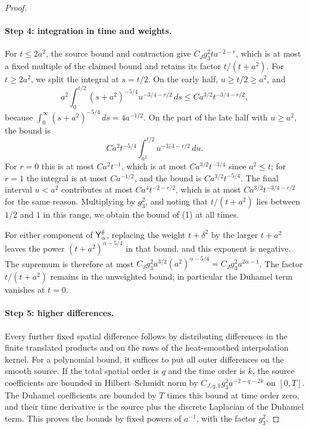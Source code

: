 \begin{proof}
\paragraph{Step 4: integration in time and weights.}
For $t\le2a^2$, the source bound and contraction give $C_Jg_3^2ta^{-2-r}$, which is at most a fixed multiple of the claimed bound and retains its factor $t/(t+a^2)$. For $t\ge2a^2$, we split the integral at $s=t/2$. On the early half, $u\ge t/2\ge a^2$, and
\[
 a^2\int_0^{t/2}(s+a^2)^{-5/4}u^{-3/4-r/2}\,ds\le Ca^{3/2}t^{-3/4-r/2},
\]
because $\int_0^\infty(s+a^2)^{-5/4}\,ds=4a^{-1/2}$. On the part of the late half with $u\ge a^2$, the bound is
\[
 Ca^2t^{-5/4}\int_{a^2}^{t/2}u^{-3/4-r/2}\,du.
\]
For $r=0$ this is at most $Ca^2t^{-1}$, which is at most $Ca^{3/2}t^{-3/4}$ since $a^2\le t$; for $r=1$ the integral is at most $Ca^{-1/2}$, and the bound is $Ca^{3/2}t^{-5/4}$. The final interval $u<a^2$ contributes at most $Ca^4t^{-2-r/2}$, which is at most $Ca^{3/2}t^{-3/4-r/2}$ for the same reason. Multiplying by $g_3^2$, and noting that $t/(t+a^2)$ lies between $1/2$ and $1$ in this range, we obtain the bound of (1) at all times.

For either component of $\mathsf Y_{\alpha}^{\delta}$, replacing the weight $t+\delta^2$ by the larger $t+a^2$ leaves the power $(t+a^2)^{\alpha-5/4}$ in that bound, and this exponent is negative. The supremum is therefore at most $C_Jg_3^2a^{3/2}(a^2)^{\alpha-5/4}=C_Jg_3^2a^{2\alpha-1}$. The factor $t/(t+a^2)$ remains in the unweighted bound; in particular the Duhamel term vanishes at $t=0$.

\paragraph{Step 5: higher differences.}
Every further fixed spatial difference follows by distributing differences in the finite translated products and on the rows of the heat-smoothed interpolation kernel. For a polynomial bound, it suffices to put all outer differences on the smooth source. If the total spatial order is $q$ and the time order is $k$, the source coefficients are bounded in Hilbert--Schmidt norm by $C_{J,q,k}g_3^2a^{-2-q-2k}$ on $[0,T]$. The Duhamel coefficients are bounded by $T$ times this bound at time order zero, and their time derivative is the source plus the discrete Laplacian of the Duhamel term. This proves the bounds by fixed powers of $a^{-1}$, with the factor $g_3^2$.


\end{proof}
